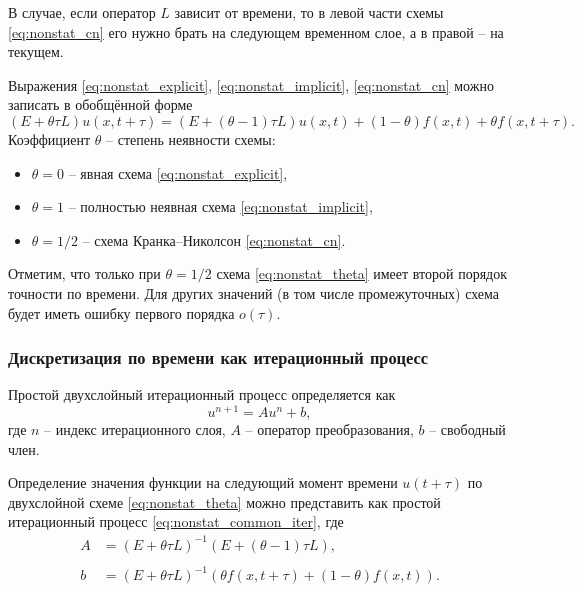 В случае, если оператор $L$ зависит от времени, то
в левой части схемы \eqref{eq:nonstat_cn} его нужно
брать на следующем временном слое, а в правой -- на текущем.


Выражения
\eqref{eq:nonstat_explicit},
\eqref{eq:nonstat_implicit},
\eqref{eq:nonstat_cn}
можно записать в обобщённой форме
\begin{equation}
    \label{eq:nonstat_theta}
    \left(E+\theta\tau L\right) u(x, t+\tau) = \left(E + \left(\theta - 1\right)\tau L\right) u(x, t) + \left(1 - \theta\right) f(x, t) + \theta f(x, t + \tau).
\end{equation}
Коэффициент $\theta$ -- степень неявности схемы:
\begin{itemize}
\item $\theta = 0$ -- явная схема \eqref{eq:nonstat_explicit},
\item $\theta = 1$ -- полностью неявная схема \eqref{eq:nonstat_implicit},
\item $\theta = 1/2$ -- схема Кранка--Николсон \eqref{eq:nonstat_cn}.
\end{itemize}

Отметим, что только при $\theta = 1/2$ схема \eqref{eq:nonstat_theta} имеет второй порядок точности по времени.
Для других значений (в том числе промежуточных) схема будет иметь ошибку первого порядка $o(\tau)$.

\subsubsection{Дискретизация по времени как итерационный процесс}


Простой двухслойный итерационный процесс определяется как
\begin{equation}
    \label{eq:nonstat_common_iter}
    u^{n+1} = A u^{n} + b,
\end{equation}
где $n$ -- индекс итерационного слоя,
$A$ -- оператор преобразования,
$b$ -- свободный член.

Определение значения функции на следующий момент времени $u(t+\tau)$ 
по двухслойной схеме \eqref{eq:nonstat_theta} можно представить как простой итерационный процесс \eqref{eq:nonstat_common_iter}, где
\begin{align*}
    A &= \left(E + \theta \tau L \right)^{-1} \left(E + (\theta - 1) \tau L \right), \\\\
    b &= \left(E + \theta \tau L \right)^{-1} \left( \theta f\left(x, t + \tau\right) + \left(1 - \theta\right) f\left(x, t\right) \right).
\end{align*}

